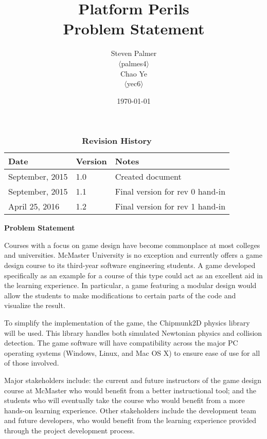 \documentclass[12pt, titlepage]{article}
\begin{document}
\title{\bf Platform Perils\\[\baselineskip]\Large Problem Statement}
\author{Steven Palmer\\$\langle$palmes4$\rangle$\\Chao Ye\\$\langle$yec6$\rangle$}
\date{\today}
	
\maketitle

\begin{table}[tp]
\caption*{\bf Revision History}
\begin{tabularx}{\textwidth}{p{3cm}p{2cm}X}
\toprule {\bf Date} & {\bf Version} & {\bf Notes}\\
\midrule
September, 2015 & 1.0 & Created document\\
September, 2015 & 1.1 & Final version for rev 0 hand-in\\
April 25, 2016 & 1.2 & Final version for rev 1 hand-in\\
\bottomrule
\end{tabularx}
\end{table}

\begin{center}
\Large \bf Problem Statement
\end{center}

Courses with a focus on game design have become commonplace at most colleges and universities.  McMaster University is no exception and currently offers a game design course to its third-year software engineering students.  A game developed specifically as an example for a course of this type could act as an excellent aid in the learning experience.  In particular, a game featuring a modular design would allow the students to make modifications to certain parts of the code and visualize the result.

To simplify the implementation of the game, the Chipmunk2D physics library will be used.  This library handles both simulated Newtonian physics and collision detection. The game software will have compatibility across the major PC operating systems (Windows, Linux, and Mac OS X) to ensure ease of use for all of those involved.

Major stakeholders include: the current and future instructors of the game design course at McMaster who would benefit from a better instructional tool; and the students who will eventually take the course who would benefit from a more hands-on learning experience.  Other stakeholders include the development team and future developers, who would benefit from the learning experience provided through the project development process.
\end{document}
